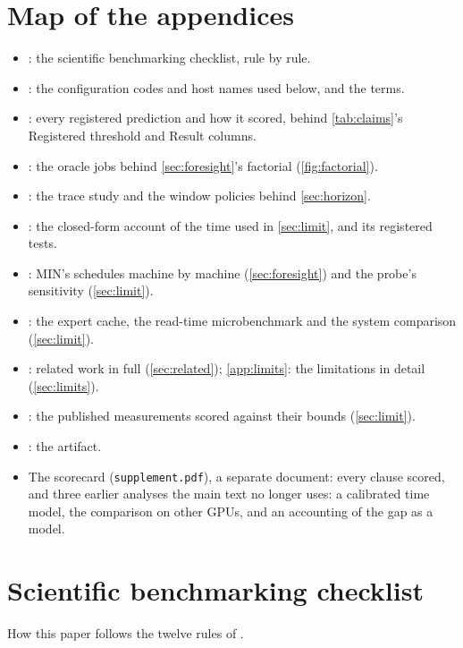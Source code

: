 \section{Map of the appendices}\label{app:map}
\begin{itemize}\setlength\itemsep{0pt}
\item {}: the scientific benchmarking checklist, rule by rule.
\item {}: the configuration codes and host names used below, and the terms.
\item {}: every registered prediction and how it scored, behind \cref{tab:claims}'s Registered threshold and Result columns.
\item {}: the oracle jobs behind \cref{sec:foresight}'s factorial (\cref{fig:factorial}).
\item {}: the trace study and the window policies behind \cref{sec:horizon}.
\item {}: the closed-form account of the time used in \cref{sec:limit}, and its registered tests.
\item {}: MIN's schedules machine by machine (\cref{sec:foresight}) and the probe's sensitivity (\cref{sec:limit}).
\item {}: the expert cache, the read-time microbenchmark and the system comparison (\cref{sec:limit}).
\item {}: related work in full (\cref{sec:related}); \cref{app:limits}: the limitations in detail (\cref{sec:limits}).
\item {}: the published measurements scored against their bounds (\cref{sec:limit}).
\item {}: the artifact.
\item The scorecard (\texttt{supplement.pdf}), a separate document: every clause scored, and three earlier analyses the main text no longer uses: a calibrated
time model, the comparison on other GPUs, and an accounting of the gap as a model.
\end{itemize}

\section{Scientific benchmarking checklist}\label{app:rules}
How this paper follows the twelve rules of \citet{hoefler2015benchmarking}.

